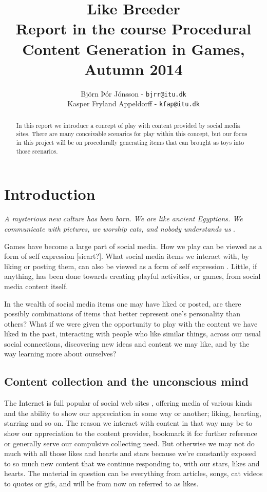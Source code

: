 \documentclass[]{article}
\title{Like Breeder\\ \small Report in the course Procedural Content Generation in Games, Autumn 2014}
\author{Björn Þór Jónsson - \texttt{bjrr@itu.dk}\\Kasper Fryland Appeldorff - \texttt{kfap@itu.dk}}
\begin{document}

\maketitle
\listoftodos %
\newpage
\begin{abstract}
In this report we introduce a concept of play with content provided by social media sites.  There are many conceivable scenarios for play within this concept, but our focus in this project will be on procedurally generating items that can brought as toys into those scenarios.
\end{abstract}



\section{Introduction}
\label{sec:Introduction}

\begin{center}
\textit{A mysterious new culture has been born. We are like ancient Egyptians. We communicate with pictures, we worship cats, and nobody understands us} \cite{gross2013makes}.
\end{center}


Games have become a large part of social media.  How we play can be viewed as a form of self expression [sicart?].  What social media items we interact with, by liking or posting them, can also be viewed as a form of self expression \cite{bargh2002can}.  Little, if anything, has been done towards creating playful activities, or games, from social media content itself.

In the wealth of social media items one may have liked or posted, are there possibly
combinations of items that better represent one's personality than others?  What if we were given the opportunity to play with the content we have liked in the past, interacting with people who like similar things, across our usual social connections, discovering new ideas and content we may like, and by the way learning more about ourselves?


\subsection{Content collection and the unconscious mind}

The Internet is full popular of social web sites \cite{LeadingSocialNetworks}, offering media of various kinds and the ability to show our appreciation in some way or another; liking, hearting, starring and so on.  The reason we interact with content in that way may be to show our appreciation to the content provider, bookmark it for further reference or generally serve our compulsive collecting need.  But otherwise we may not do much with all those likes and hearts and stars because we're constantly exposed to so much new content that we continue responding to, with our stars, likes and hearts.  The material in question can be everything from articles, songs, cat videos to quotes or gifs, and will be from now on referred to as likes.
\end{document}
